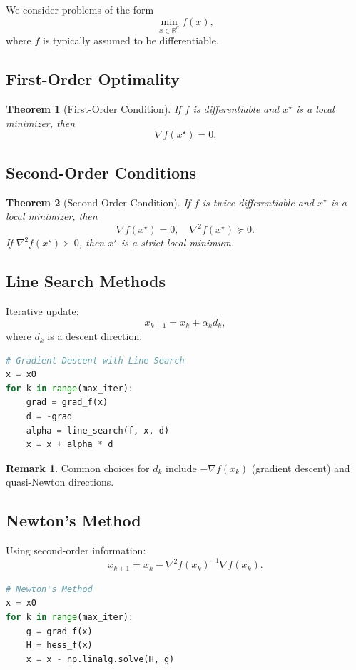 \documentclass[12pt,oneside]{book}
\numberwithin{equation}{section}
\theoremstyle{definition}
\newtheorem{remark}{Remark}[section]
\theoremstyle{plain}
\newtheorem{theorem}{Theorem}[section]
\theoremstyle{remark}
\newcommand{\R}{\mathbb{R}}
\newcommand{\grad}{\nabla}
\newcommand{\Hess}{\nabla^2}
\begin{document}
We consider problems of the form
\[
\min_{x \in \R^d} f(x),
\]
where $f$ is typically assumed to be differentiable.

\subsection{First-Order Optimality}

\begin{theorem}[First-Order Condition]
If $f$ is differentiable and $x^\star$ is a local minimizer, then
\[
\grad f(x^\star) = 0.
\]
\end{theorem}

\subsection{Second-Order Conditions}

\begin{theorem}[Second-Order Condition]
If $f$ is twice differentiable and $x^\star$ is a local minimizer, then
\[
\grad f(x^\star) = 0, \quad \Hess f(x^\star) \succeq 0.
\]
If $\Hess f(x^\star) \succ 0$, then $x^\star$ is a strict local minimum.
\end{theorem}

\subsection{Line Search Methods}

Iterative update:
\[
x_{k+1} = x_k + \alpha_k d_k,
\]
where $d_k$ is a descent direction.

\begin{lstlisting}[language=Python]
# Gradient Descent with Line Search
x = x0
for k in range(max_iter):
    grad = grad_f(x)
    d = -grad
    alpha = line_search(f, x, d)
    x = x + alpha * d
\end{lstlisting}

\begin{remark}
Common choices for $d_k$ include $-\grad f(x_k)$ (gradient descent) and quasi-Newton directions.
\end{remark}

\subsection{Newton's Method}

Using second-order information:
\[
x_{k+1} = x_k - \Hess f(x_k)^{-1} \grad f(x_k).
\]

\begin{lstlisting}[language=Python]
# Newton's Method
x = x0
for k in range(max_iter):
    g = grad_f(x)
    H = hess_f(x)
    x = x - np.linalg.solve(H, g)
\end{lstlisting}
\end{document}
